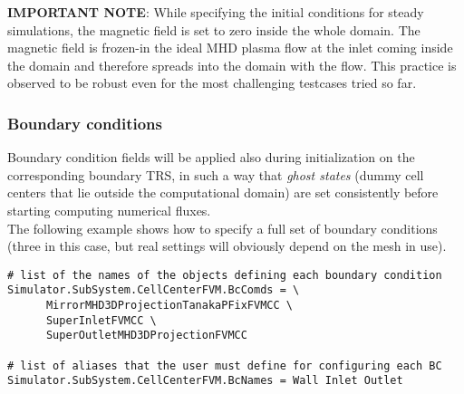 \documentclass[11pt]{article}
\begin{document}
{\bf IMPORTANT NOTE}: While specifying the initial conditions for steady simulations, the magnetic field is set to zero inside the whole domain. The magnetic field is frozen-in the ideal MHD plasma flow at the inlet coming inside the domain and therefore spreads into the domain with the flow. This practice is observed to be robust even for the most challenging testcases tried so far.

\subsubsection{Boundary conditions}

Boundary condition fields will be applied also during initialization on the corresponding boundary TRS,
in such a way that {\it ghost states} (dummy cell centers that lie outside the computational domain) are set 
consistently before starting computing numerical fluxes. \\
The following example shows how to specify a full set of boundary conditions (three in this case, but 
real settings will obviously depend on the mesh in use).

\begin{lstlisting}[breaklines]
# list of the names of the objects defining each boundary condition
Simulator.SubSystem.CellCenterFVM.BcComds = \
      MirrorMHD3DProjectionTanakaPFixFVMCC \
      SuperInletFVMCC \
      SuperOutletMHD3DProjectionFVMCC

# list of aliases that the user must define for configuring each BC
Simulator.SubSystem.CellCenterFVM.BcNames = Wall Inlet Outlet
\end{lstlisting}
\end{document}
